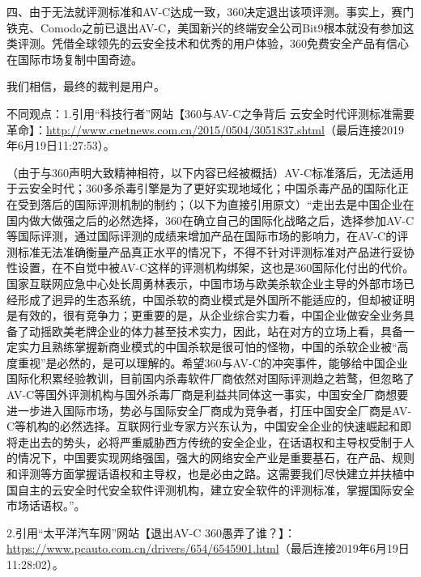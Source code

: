 四、由于无法就评测标准和AV-C达成一致，360决定退出该项评测。事实上，赛门铁克、Comodo之前已退出AV-C，美国新兴的终端安全公司Bit9根本就没有参加这类评测。凭借全球领先的云安全技术和优秀的用户体验，360免费安全产品有信心在国际市场复制中国奇迹。 \par 我们相信，最终的裁判是用户。 \par 不同观点：1.引用“科技行者”网站【360与AV-C之争背后 云安全时代评测标准需要革命】：\url{http://www.cnetnews.com.cn/2015/0504/3051837.shtml}（最后连接2019年6月19日11:27:53）。 \par （由于与360声明大致精神相符，以下内容已经被概括）AV-C标准落后，无法适用于云安全时代；360多杀毒引擎是为了更好实现地域化；中国杀毒产品的国际化正在受到落后的国际评测机制的制约；（以下为直接引用原文）“走出去是中国企业在国内做大做强之后的必然选择，360在确立自己的国际化战略之后，选择参加AV-C等国际评测，通过国际评测的成绩来增加产品在国际市场的影响力，在AV-C的评测标准无法准确衡量产品真正水平的情况下，不得不针对评测标准对产品进行妥协性设置，在不自觉中被AV-C这样的评测机构绑架，这也是360国际化付出的代价。国家互联网应急中心处长周勇林表示，中国市场与欧美杀软企业主导的外部市场已经形成了迥异的生态系统，中国杀软的商业模式是外国所不能适应的，但却被证明是有效的，很有竞争力；更重要的是，从企业综合实力看，中国企业做安全业务具备了动摇欧美老牌企业的体力甚至技术实力，因此，站在对方的立场上看，具备一定实力且熟练掌握新商业模式的中国杀软是很可怕的怪物，中国的杀软企业被“高度重视”是必然的，是可以理解的。希望360与AV-C的冲突事件，能够给中国企业国际化积累经验教训，目前国内杀毒软件厂商依然对国际评测趋之若鹜，但忽略了AV-C等国外评测机构与国外杀毒厂商是利益共同体这一事实，中国安全厂商想要进一步进入国际市场，势必与国际安全厂商成为竞争者，打压中国安全厂商是AV-C等机构的必然选择。互联网行业专家方兴东认为，中国安全企业的快速崛起和即将走出去的势头，必将严重威胁西方传统的安全企业，在话语权和主导权受制于人的情况下，中国要实现网络强国，强大的网络安全产业是重要基石，在产品、规则和评测等方面掌握话语权和主导权，也是必由之路。这需要我们尽快建立并扶植中国自主的云安全时代安全软件评测机构，建立安全软件的评测标准，掌握国际安全市场话语权。”。 \par 2.引用“太平洋汽车网”网站【退出AV-C 360愚弄了谁？】：\url{https://www.pcauto.com.cn/drivers/654/6545901.html}（最后连接2019年6月19日11:28:02）。\par 